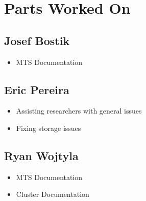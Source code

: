 \documentclass[12pt]{article}
\begin{document}
\section{Parts Worked On}

\subsection{Josef Bostik}

\begin{itemize}
\item MTS Documentation
\end{itemize}

\subsection{Eric Pereira}

\begin{itemize}
\item Assisting researchers with general issues
\item Fixing storage issues
\end{itemize}

\subsection{Ryan Wojtyla}

\begin{itemize}
\item MTS Documentation
\item Cluster Documentation 
\end{itemize}


\end{document}
